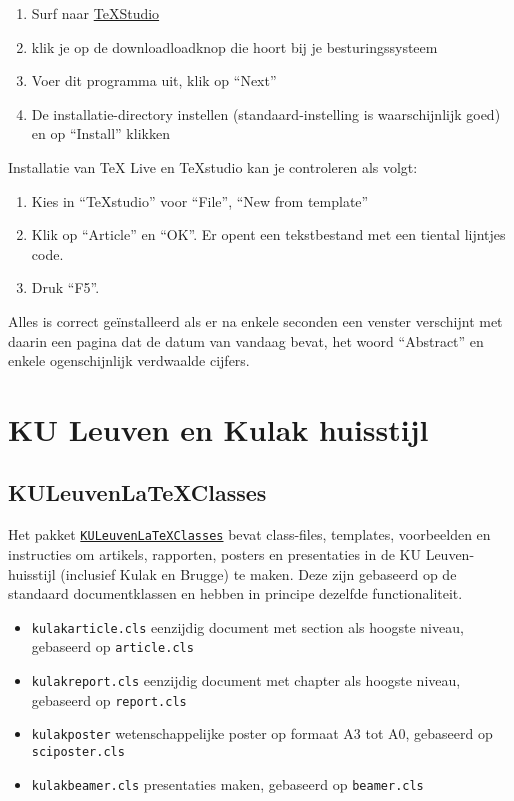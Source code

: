 \documentclass[kulak]{kulakarticle} %
\begin{document}
\begin{enumerate}
\item Surf naar  \href{http://texstudio.sourceforge.net/}{TeXStudio}
\item klik je op de downloadloadknop die hoort bij je besturingssysteem
\item Voer dit programma uit, klik op ``Next''
\item De installatie-directory instellen (standaard-instelling is waarschijnlijk goed) en op ``Install'' klikken
\end{enumerate}
Installatie van TeX Live en TeXstudio kan je controleren als volgt:
\begin{enumerate}
\item Kies in ``TeXstudio'' voor ``File'', ``New from template''
\item Klik op ``Article'' en ``OK''. Er opent een tekstbestand met een tiental lijntjes code.
\item Druk ``F5''.
\end{enumerate}
Alles is correct geïnstalleerd als er na enkele seconden een venster verschijnt met daarin een pagina dat de datum van vandaag bevat, het woord ``Abstract'' en enkele ogenschijnlijk verdwaalde cijfers.

\section{KU Leuven en Kulak huisstijl}
\label{sec:huisstijl}
\subsection{KULeuvenLaTeXClasses}
Het pakket \href{https://github.com/srebry/KULeuvenLaTeXClasses}{\texttt{KULeuvenLaTeXClasses}} bevat class-files, templates, voorbeelden en instructies om artikels, rapporten, posters en presentaties in de KU Leuven-huisstijl (inclusief Kulak en Brugge) te maken. Deze zijn gebaseerd op de standaard documentklassen en hebben in principe dezelfde functionaliteit.
\begin{itemize}
\item \texttt{kulakarticle.cls} eenzijdig document met section als hoogste niveau, gebaseerd op \texttt{article.cls}
\item \texttt{kulakreport.cls} eenzijdig document met chapter als hoogste niveau, gebaseerd op \texttt{report.cls}
\item \texttt{kulakposter} wetenschappelijke poster op formaat A3 tot A0, gebaseerd op \texttt{sciposter.cls}
\item \texttt{kulakbeamer.cls} presentaties maken, gebaseerd op \texttt{beamer.cls}
\end{itemize}
\end{document}
